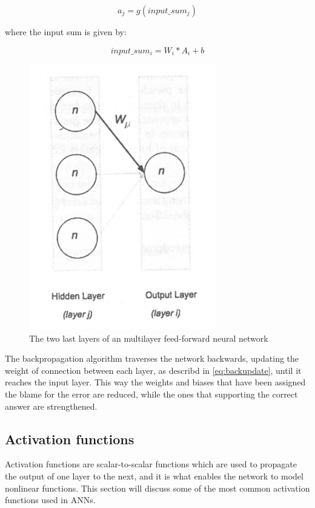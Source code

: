 \begin{equation}\label{eq:activation}
a_{j} = g(input\_sum_{j})
\end{equation}

where the input sum is given by:

\begin{equation}\label{eq:inputsum}
	input\_sum_{i} = W_{i}*A_{i}+b
\end{equation}

\begin{figure}[!h]
	\centering
	\includegraphics[scale=1]{fig/backpropagation_two_layers.png}
	\caption{The two last layers of an multilayer feed-forward neural network \cite{Patterson2017}}
	\label{fig:backpropagationtwolayers}
\end{figure}

The backpropagation algorithm traverses the network backwards, updating the weight of connection between each layer, as describd in \autoref{eq:backupdate}, until it reaches the input layer. This way the weights and biases that have been assigned the blame for the error are reduced, while the ones that supporting the correct answer are strengthened. 

\subsection{Activation functions}
Activation functions are scalar-to-scalar functions which are used to propagate the output of one layer to the next, and it is what enables the network to model nonlinear functions. This section will discuss some of the most common activation functions used in ANNs.

